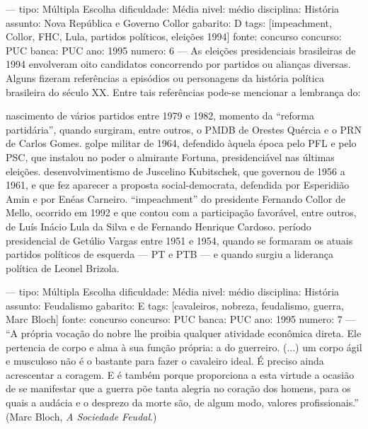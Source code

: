 ---
tipo: Múltipla Escolha
dificuldade: Média
nivel: médio
disciplina: História
assunto: Nova República e Governo Collor
gabarito: D
tags: [impeachment, Collor, FHC, Lula, partidos políticos, eleições 1994]
fonte: concurso
concurso: PUC
banca: PUC
ano: 1995
numero: 6
---
\question
As eleições presidenciais brasileiras de 1994 envolveram oito candidatos concorrendo por partidos ou alianças diversas. Alguns fizeram referências a episódios ou personagens da história política brasileira do século XX. Entre tais referências pode-se mencionar a lembrança do:
\begin{choices}
\choice nascimento de vários partidos entre 1979 e 1982, momento da ``reforma partidária'', quando surgiram, entre outros, o PMDB de Orestes Quércia e o PRN de Carlos Gomes.
\choice golpe militar de 1964, defendido àquela época pelo PFL e pelo PSC, que instalou no poder o almirante Fortuna, presidenciável nas últimas eleições.
\choice desenvolvimentismo de Juscelino Kubitschek, que governou de 1956 a 1961, e que fez aparecer a proposta social-democrata, defendida por Esperidião Amin e por Enéas Carneiro.
\CorrectChoice ``impeachment'' do presidente Fernando Collor de Mello, ocorrido em 1992 e que contou com a participação favorável, entre outros, de Luís Inácio Lula da Silva e de Fernando Henrique Cardoso.
\choice período presidencial de Getúlio Vargas entre 1951 e 1954, quando se formaram os atuais partidos políticos de esquerda --- PT e PTB --- e quando surgiu a liderança política de Leonel Brizola.
\end{choices}

---
tipo: Múltipla Escolha
dificuldade: Média
nivel: médio
disciplina: História
assunto: Feudalismo
gabarito: E
tags: [cavaleiros, nobreza, feudalismo, guerra, Marc Bloch]
fonte: concurso
concurso: PUC
banca: PUC
ano: 1995
numero: 7
---
\question
``A própria vocação do nobre lhe proibia qualquer atividade econômica direta. Ele pertencia de corpo e alma à sua função própria: a do guerreiro. (...) um corpo ágil e musculoso não é o bastante para fazer o cavaleiro ideal. É preciso ainda acrescentar a coragem. E é também porque proporciona a esta virtude a ocasião de se manifestar que a guerra põe tanta alegria no coração dos homens, para os quais a audácia e o desprezo da morte são, de algum modo, valores profissionais.'' (Marc Bloch, \textit{A Sociedade Feudal}.)


